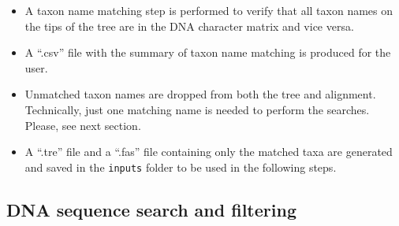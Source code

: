 \documentclass[]{article}
\begin{document}
\begin{itemize}
\item
  A taxon name matching step is performed to verify that all taxon names on the tips
  of the tree are in the DNA character matrix and vice versa.
\item
  A ``.csv'' file with the summary of taxon name matching is produced for the user.
\item
  Unmatched taxon names are dropped from both the tree and alignment.
  Technically, just one matching name is needed to perform the searches. Please, see next section.
\item
  A ``.tre'' file and a ``.fas'' file containing only the matched taxa are generated and saved in the \texttt{inputs} folder to be used in the following steps.
\end{itemize}

\hypertarget{dna-sequence-search-and-filtering}{%
\subsection{DNA sequence search and filtering}\label{dna-sequence-search-and-filtering}}
\end{document}
